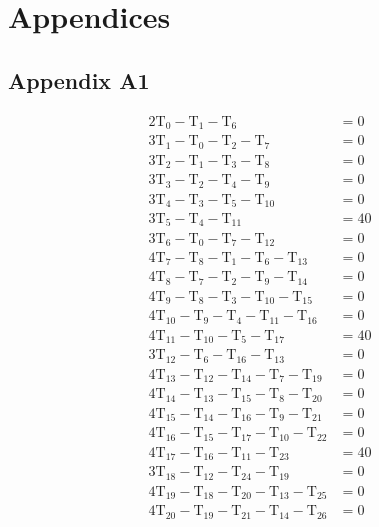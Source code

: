 \documentclass[12pt,a4paper]{article}
\begin{document}
\section{Appendices}
\subsection*{Appendix A1}
\begin{align*}
2\text{T}_0-\text{T}_1-\text{T}_6              & =0\\
3\text{T}_1-\text{T}_0-\text{T}_2-\text{T}_7          & =0\\
3\text{T}_2-\text{T}_1-\text{T}_3-\text{T}_8          & =0\\
3\text{T}_3-\text{T}_2-\text{T}_4-\text{T}_9          & =0\\
3\text{T}_4-\text{T}_3-\text{T}_5-\text{T}_{10}       & =0\\
3\text{T}_5-\text{T}_4-\text{T}_{11}           & =40\\
3\text{T}_6-\text{T}_0-\text{T}_7-\text{T}_{12}       & =0\\
4\text{T}_7-\text{T}_8-\text{T}_1-\text{T}_6-\text{T}_{13}   & =0\\
4\text{T}_8-\text{T}_7-\text{T}_2-\text{T}_9-\text{T}_{14}   & =0\\
4\text{T}_9-\text{T}_8-\text{T}_3-\text{T}_{10}-\text{T}_{15}& =0\\
4\text{T}_{10}-\text{T}_9-\text{T}_4-\text{T}_{11}-\text{T}_{16} & =0\\
4\text{T}_{11}-\text{T}_{10}-\text{T}_5-\text{T}_{17} & =40\\
3\text{T}_{12}-\text{T}_6-\text{T}_{16}-\text{T}_{13} & =0\\
4\text{T}_{13}-\text{T}_{12}-\text{T}_{14}-\text{T}_{7}-\text{T}_{19} & =0\\
4\text{T}_{14}-\text{T}_{13}-\text{T}_{15}-\text{T}_{8}-\text{T}_{20} & =0\\
4\text{T}_{15}-\text{T}_{14}-\text{T}_{16}-\text{T}_{9}-\text{T}_{21} & =0\\
4\text{T}_{16}-\text{T}_{15}-\text{T}_{17}-\text{T}_{10}-\text{T}_{22}& =0\\
4\text{T}_{17}-\text{T}_{16}-\text{T}_{11}-\text{T}_{23} & =40\\
3\text{T}_{18}-\text{T}_{12}-\text{T}_{24}-\text{T}_{19} & =0\\
4\text{T}_{19}-\text{T}_{18}-\text{T}_{20}-\text{T}_{13}-\text{T}_{25} & =0\\
4\text{T}_{20}-\text{T}_{19}-\text{T}_{21}-\text{T}_{14}-\text{T}_{26} & =0\\

\end{align*}
\end{document}
